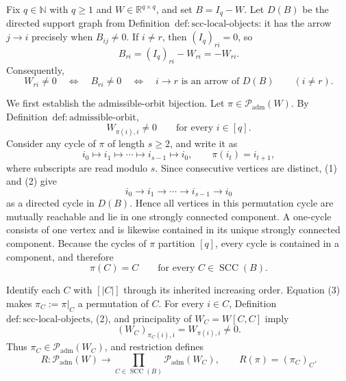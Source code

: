 Fix \(q\in\mathbb N\) with \(q\geq 1\) and \(W\in\mathbb R^{q\times q}\), and set \(B=I_q-W\).  Let \(D(B)\) be the directed support graph from Definition~\(\mathrm{def:scc\text{-}local\text{-}objects}\): it has the arrow \(j\to i\) precisely when \(B_{ij}\neq0\).  If \(i\neq r\), then \((I_q)_{ri}=0\), so
\[
 B_{ri}=(I_q)_{ri}-W_{ri}=-W_{ri}.
\]
Consequently,
\[
 W_{ri}\neq0
 \quad\Longleftrightarrow\quad
 B_{ri}\neq0
 \quad\Longleftrightarrow\quad
 i\to r\text{ is an arrow of }D(B)
 \qquad(i\neq r). \tag{1}
\]

We first establish the admissible-orbit bijection.  Let \(\pi\in\mathcal P_{\mathrm{adm}}(W)\).  By Definition~\(\mathrm{def:admissible\text{-}orbit}\),
\[
 W_{\pi(i),i}\neq0
 \qquad\text{for every }i\in[q]. \tag{2}
\]
Consider any cycle of \(\pi\) of length \(s\geq2\), and write it as
\[
 i_0\longmapsto i_1\longmapsto\cdots
 \longmapsto i_{s-1}\longmapsto i_0,
 \qquad \pi(i_t)=i_{t+1},
\]
where subscripts are read modulo \(s\).  Since consecutive vertices are distinct, (1) and (2) give
\[
 i_0\longrightarrow i_1\longrightarrow\cdots
 \longrightarrow i_{s-1}\longrightarrow i_0
\]
as a directed cycle in \(D(B)\).  Hence all vertices in this permutation cycle are mutually reachable and lie in one strongly connected component.  A one-cycle consists of one vertex and is likewise contained in its unique strongly connected component.  Because the cycles of \(\pi\) partition \([q]\), every cycle is contained in a component, and therefore
\[
 \pi(C)=C
 \qquad\text{for every }C\in\operatorname{SCC}(B). \tag{3}
\]

Identify each \(C\) with \([|C|]\) through its inherited increasing order.  Equation (3) makes \(\pi_C:=\pi|_C\) a permutation of \(C\).  For every \(i\in C\), Definition~\(\mathrm{def:scc\text{-}local\text{-}objects}\), (2), and principality of \(W_C=W[C,C]\) imply
\[
 (W_C)_{\pi_C(i),i}=W_{\pi(i),i}\neq0. \tag{4}
\]
Thus \(\pi_C\in\mathcal P_{\mathrm{adm}}(W_C)\), and restriction defines
\[
 R:\mathcal P_{\mathrm{adm}}(W)
 \longrightarrow
 \prod_{C\in\operatorname{SCC}(B)}
 \mathcal P_{\mathrm{adm}}(W_C),
 \qquad
 R(\pi)=(\pi_C)_C. \tag{5}
\]


